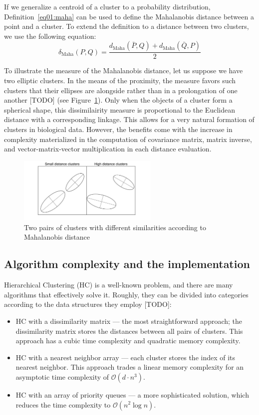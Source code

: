 If we generalize a centroid of a cluster to a probability distribution, Definition~\ref{eq01:maha} can be used to define the Mahalanobis distance between a point and a cluster. To extend the definition to a distance between two clusters, we use the following equation:
\begin{equation}
    \delta_\text{Maha}(P,Q) = \frac{d_\text{Maha}(\bar{P},Q) + d_\text{Maha}(\bar{Q},P)}{2}
\end{equation}\label{eq01:maha_linkage}

To illustrate the measure of the Mahalanobis distance, let us suppose we have two elliptic clusters. In the means of the proximity, the measure favors such clusters that their ellipses are alongside rather than in a prolongation of one another [TODO] (see Figure~\ref{fig:ellipses}). 
Only when the objects of a cluster form a spherical shape, this dissimilairity measure is proportional to the Euclidean distance with a corresponding linkage.
This allows for a very natural formation of clusters in biological data. However, the benefits come with the increase in complexity materialized in the computation of covariance matrix, matrix inverse, and vector-matrix-vector multiplication in each distance evaluation.

\begin{figure}[h]
    \centering
    \includegraphics[width=0.6\textwidth]{img/ellipses.pdf}
    \caption{Two pairs of clusters with different similarities according to Mahalanobis distance}
    \label{fig:ellipses}
\end{figure}

\subsection{Algorithm complexity and the implementation}

Hierarchical Clustering (HC) is a well-known problem, and there are many algorithms that effectively solve it. Roughly, they can be divided into categories according to the data structures they employ [TODO]:
\begin{itemize}
    \item HC with a dissimilarity matrix --- the most straightforward approach; the dissimilarity matrix stores the distances between all pairs of clusters. This approach has a cubic time complexity and quadratic memory complexity.
    \item HC with a nearest neighbor array --- each cluster stores the index of its nearest neighbor. This approach trades a linear memory complexity for an asymptotic time complexity of $\mathcal{O}(d \cdot n^3)$.
    \item HC with an array of priority queues --- a more sophisticated solution, which reduces the time complexity to $\mathcal{O}(n^2 \log n)$.
\end{itemize}

